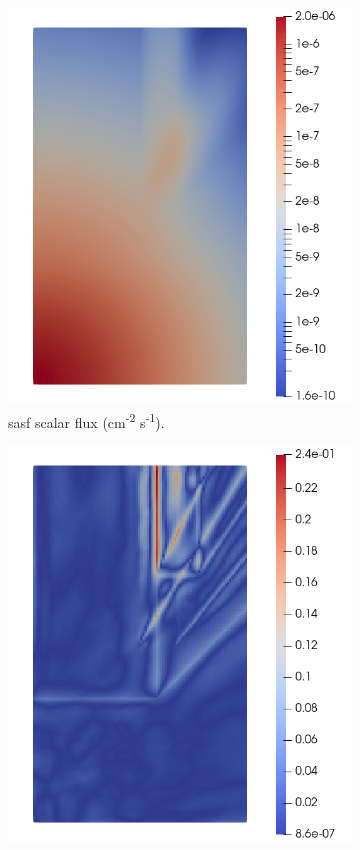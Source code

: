 \begin{figure}[H]
\begin{subfigure}[b]{0.47\textwidth}
        \includegraphics[width=\textwidth]{images/verification/sasf_kobayashi/sasf_z35.png}
        \caption{\acrshort{sasf} scalar flux (cm\textsuperscript{-2} s\textsuperscript{-1}).}
        \label{fig:verification:sasf:sasf_z35}
    \end{subfigure}
    \begin{subfigure}[b]{0.47\textwidth}
        \centering
        \includegraphics[width=\textwidth]{images/verification/sasf_kobayashi/error_z35}

\end{subfigure}
\end{figure}
